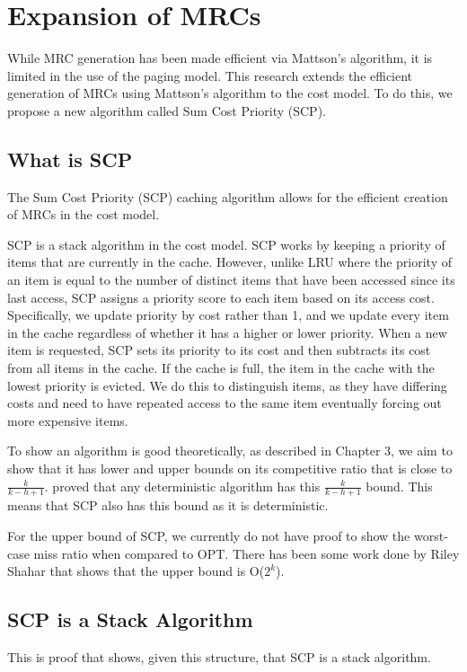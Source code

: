 
\chapter{Expansion of MRCs}
While MRC generation has been made efficient via Mattson's algorithm, it is limited in the use of the paging model. This research extends the efficient generation of MRCs using Mattson's algorithm to the cost model. To do this, we propose a new algorithm called Sum Cost Priority (SCP).



\section{What is SCP}
The Sum Cost Priority (SCP) caching algorithm allows for the efficient creation of MRCs in the cost model. 

SCP is a stack algorithm in the cost model. SCP works by keeping a priority of items that are currently in the cache. However, unlike LRU where the priority of an item is equal to the number of distinct items that have been accessed since its last access, SCP assigns a priority score to each item based on its access cost. Specifically, we update priority by cost rather than 1, and we update every item in the cache regardless of whether it has a higher or lower priority. When a new item is requested, SCP sets its priority to its cost and then subtracts its cost from all items in the cache. If the cache is full, the item in the cache with the lowest priority is evicted. We do this to distinguish items, as they have differing costs and need to have repeated access to the same item eventually forcing out more expensive items.






To show an algorithm is good theoretically, as described in Chapter 3, we aim to show that it has lower and upper bounds on its competitive ratio that is close to $\frac{k}{k-h+1}$.  \cite{sleator1985amortized} proved that any deterministic algorithm has this $\frac{k}{k-h+1}$ bound. This means that SCP also has this bound as it is deterministic.

For the upper bound of SCP, we currently do not have proof to show the worst-case miss ratio when compared to OPT. There has been some work done by Riley Shahar that shows that the upper bound is O($2^k$).


\section{SCP is a Stack Algorithm}
This is proof that shows, given this structure, that SCP is a stack algorithm.

